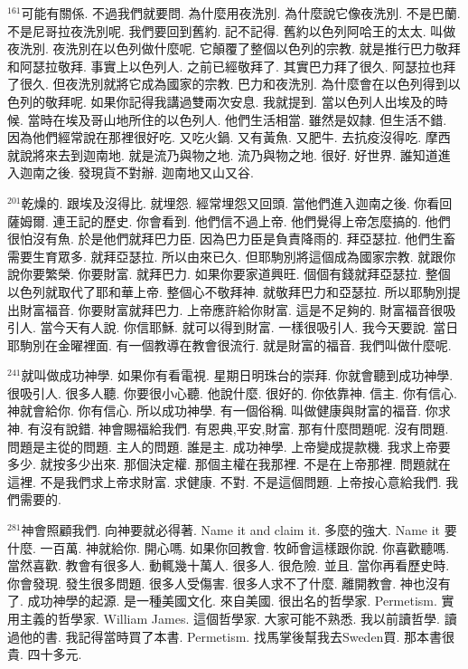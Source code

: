 \documentclass{book}
\begin{document}
$^{161}$可能有關係.
不過我們就要問.
為什麼用夜洗別.
為什麼說它像夜洗別.
不是巴蘭.
不是尼哥拉夜洗別呢.
我們要回到舊約.
記不記得.
舊約以色列阿哈王的太太.
叫做夜洗別.
夜洗別在以色列做什麼呢.
它顛覆了整個以色列的宗教.
就是推行巴力敬拜和阿瑟拉敬拜.
事實上以色列人.
之前已經敬拜了.
其實巴力拜了很久.
阿瑟拉也拜了很久.
但夜洗別就將它成為國家的宗教.
巴力和夜洗別.
為什麼會在以色列得到以色列的敬拜呢.
如果你記得我講過雙兩次安息.
我就提到.
當以色列人出埃及的時候.
當時在埃及哥山地所住的以色列人.
他們生活相當.
雖然是奴隸.
但生活不錯.
因為他們經常說在那裡很好吃.
又吃火鍋.
又有黃魚.
又肥牛.
去抗疫沒得吃.
摩西就說將來去到迦南地.
就是流乃與物之地.
流乃與物之地.
很好.
好世界.
誰知道進入迦南之後.
發現貨不對辦.
迦南地又山又谷.

$^{201}$乾燥的.
跟埃及沒得比.
就埋怨.
經常埋怨又回頭.
當他們進入迦南之後.
你看回薩姆爾.
連王記的歷史.
你會看到.
他們信不過上帝.
他們覺得上帝怎麼搞的.
他們很怕沒有魚.
於是他們就拜巴力臣.
因為巴力臣是負責降雨的.
拜亞瑟拉.
他們生畜需要生育眾多.
就拜亞瑟拉.
所以由來已久.
但耶駒別將這個成為國家宗教.
就跟你說你要繁榮.
你要財富.
就拜巴力.
如果你要家道興旺.
個個有錢就拜亞瑟拉.
整個以色列就取代了耶和華上帝.
整個心不敬拜神.
就敬拜巴力和亞瑟拉.
所以耶駒別提出財富福音.
你要財富就拜巴力.
上帝應許給你財富.
這是不足夠的.
財富福音很吸引人.
當今天有人說.
你信耶穌.
就可以得到財富.
一樣很吸引人.
我今天要說.
當日耶駒別在金曜裡面.
有一個教導在教會很流行.
就是財富的福音.
我們叫做什麼呢.

$^{241}$就叫做成功神學.
如果你有看電視.
星期日明珠台的崇拜.
你就會聽到成功神學.
很吸引人.
很多人聽.
你要很小心聽.
他說什麼.
很好的.
你依靠神.
信主.
你有信心.
神就會給你.
你有信心.
所以成功神學.
有一個俗稱.
叫做健康與財富的福音.
你求神.
有沒有說錯.
神會賜福給我們.
有恩典,平安,財富.
那有什麼問題呢.
沒有問題.
問題是主從的問題.
主人的問題.
誰是主.
成功神學.
上帝變成提款機.
我求上帝要多少.
就按多少出來.
那個決定權.
那個主權在我那裡.
不是在上帝那裡.
問題就在這裡.
不是我們求上帝求財富.
求健康.
不對.
不是這個問題.
上帝按心意給我們.
我們需要的.

$^{281}$神會照顧我們.
向神要就必得著.
Name it and claim it.
多麼的強大.
Name it 要什麼.
一百萬.
神就給你.
開心嗎.
如果你回教會.
牧師會這樣跟你說.
你喜歡聽嗎.
當然喜歡.
教會有很多人.
動輒幾十萬人.
很多人.
很危險.
並且.
當你再看歷史時.
你會發現.
發生很多問題.
很多人受傷害.
很多人求不了什麼.
離開教會.
神也沒有了.
成功神學的起源.
是一種美國文化.
來自美國.
很出名的哲學家.
Permetism.
實用主義的哲學家.
William James.
這個哲學家.
大家可能不熟悉.
我以前讀哲學.
讀過他的書.
我記得當時買了本書.
Permetism.
找馬掌後幫我去Sweden買.
那本書很貴.
四十多元.
\end{document}
